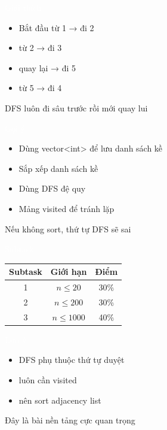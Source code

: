 \documentclass{beamer}
\newcommand{\hlblue}[1]{\textcolor{myblue}{#1}}
\newcommand{\hlred}[1]{\textcolor{myred}{#1}}
\newcommand{\hlpurple}[1]{\textcolor{mypurple}{#1}}
\newcommand{\hlwhite}[1]{\textcolor{white}{#1}}
\begin{document}
\begin{frame}{\hlwhite{Giải thích}}
\begin{itemize}
\item Bắt đầu từ 1 → đi 2
\item từ 2 → đi 3
\item quay lại → đi 5
\item từ 5 → đi 4
\end{itemize}

\begin{tcolorbox}
\centering
\hlpurple{DFS luôn đi sâu trước rồi mới quay lui}
\end{tcolorbox}
\end{frame}


\begin{frame}{\hlwhite{Gợi ý}}
\begin{itemize}
\item Dùng \hlblue{vector<int>} để lưu danh sách kề
\item Sắp xếp danh sách kề
\item Dùng DFS đệ quy
\item Mảng visited để tránh lặp
\end{itemize}

\begin{tcolorbox}
\centering
\hlred{Nếu không sort, thứ tự DFS sẽ sai}
\end{tcolorbox}
\end{frame}


\begin{frame}{\hlwhite{Subtask}}
\begin{tabular}{|c|c|c|}
\hline
Subtask & Giới hạn & Điểm \\
\hline
1 & $n \le 20$ & 30\% \\
\hline
2 & $n \le 200$ & 30\% \\
\hline
3 & $n \le 1000$ & 40\% \\
\hline
\end{tabular}
\end{frame}


\begin{frame}{\hlwhite{Lưu ý}}
\begin{itemize}
\item DFS phụ thuộc thứ tự duyệt
\item luôn cần visited
\item nên sort adjacency list
\end{itemize}

\begin{tcolorbox}
\centering
\hlblue{Đây là bài nền tảng cực quan trọng}
\end{tcolorbox}
\end{frame}
\end{document}
